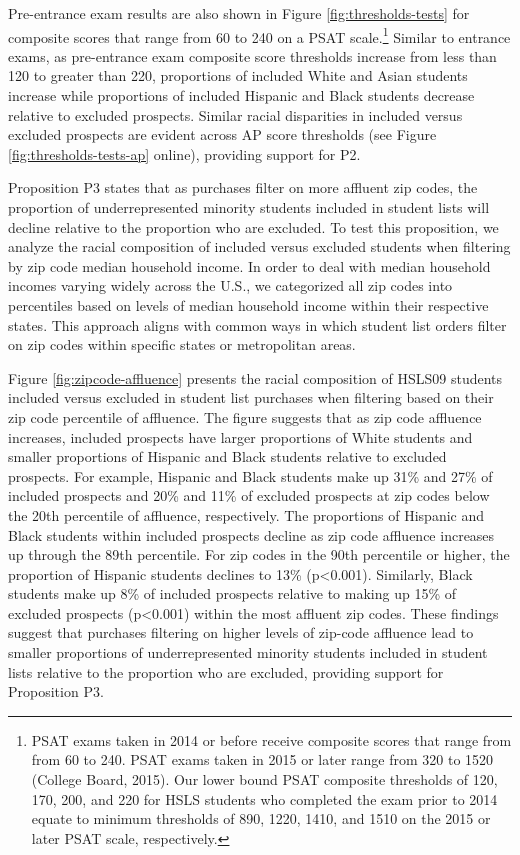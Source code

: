 \documentclass[
  12pt,
]{article}
\begin{document}
Pre-entrance exam results are also shown in Figure \ref{fig:thresholds-tests} for composite scores that range from 60 to 240 on a PSAT scale.\footnote{PSAT exams taken in 2014 or before receive composite scores that range from from 60 to 240. PSAT exams taken in 2015 or later range from 320 to 1520 (College Board, 2015). Our lower bound PSAT composite thresholds of 120, 170, 200, and 220 for HSLS students who completed the exam prior to 2014 equate to minimum thresholds of 890, 1220, 1410, and 1510 on the 2015 or later PSAT scale, respectively.} Similar to entrance exams, as pre-entrance exam composite score thresholds increase from less than 120 to greater than 220, proportions of included White and Asian students increase while proportions of included Hispanic and Black students decrease relative to excluded prospects. Similar racial disparities in included versus excluded prospects are evident across AP score thresholds (see Figure \ref{fig:thresholds-tests-ap} online), providing support for P2.

Proposition P3 states that as purchases filter on more affluent zip codes, the proportion of underrepresented minority students included in student lists will decline relative to the proportion who are excluded. To test this proposition, we analyze the racial composition of included versus excluded students when filtering by zip code median household income. In order to deal with median household incomes varying widely across the U.S., we categorized all zip codes into percentiles based on levels of median household income within their respective states. This approach aligns with common ways in which student list orders filter on zip codes within specific states or metropolitan areas.

Figure \ref{fig:zipcode-affluence} presents the racial composition of HSLS09 students included versus excluded in student list purchases when filtering based on their zip code percentile of affluence. The figure suggests that as zip code affluence increases, included prospects have larger proportions of White students and smaller proportions of Hispanic and Black students relative to excluded prospects. For example, Hispanic and Black students make up 31\% and 27\% of included prospects and 20\% and 11\% of excluded prospects at zip codes below the 20th percentile of affluence, respectively. The proportions of Hispanic and Black students within included prospects decline as zip code affluence increases up through the 89th percentile. For zip codes in the 90th percentile or higher, the proportion of Hispanic students declines to 13\% (p\textless0.001). Similarly, Black students make up 8\% of included prospects relative to making up 15\% of excluded prospects (p\textless0.001) within the most affluent zip codes. These findings suggest that purchases filtering on higher levels of zip-code affluence lead to smaller proportions of underrepresented minority students included in student lists relative to the proportion who are excluded, providing support for Proposition P3.
\end{document}
